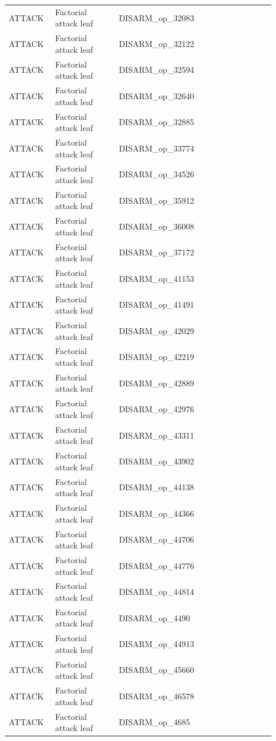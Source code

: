\begin{table}[htbp]
\begin{threeparttable}
\begin{tabular}{p{0.14\linewidth}p{0.22\linewidth}p{0.54\linewidth}}
ATTACK & Factorial attack leaf & DISARM\_op\_32083 \\
ATTACK & Factorial attack leaf & DISARM\_op\_32122 \\
ATTACK & Factorial attack leaf & DISARM\_op\_32594 \\
ATTACK & Factorial attack leaf & DISARM\_op\_32640 \\
ATTACK & Factorial attack leaf & DISARM\_op\_32885 \\
ATTACK & Factorial attack leaf & DISARM\_op\_33774 \\
ATTACK & Factorial attack leaf & DISARM\_op\_34526 \\
ATTACK & Factorial attack leaf & DISARM\_op\_35912 \\
ATTACK & Factorial attack leaf & DISARM\_op\_36008 \\
ATTACK & Factorial attack leaf & DISARM\_op\_37172 \\
ATTACK & Factorial attack leaf & DISARM\_op\_41153 \\
ATTACK & Factorial attack leaf & DISARM\_op\_41491 \\
ATTACK & Factorial attack leaf & DISARM\_op\_42029 \\
ATTACK & Factorial attack leaf & DISARM\_op\_42219 \\
ATTACK & Factorial attack leaf & DISARM\_op\_42889 \\
ATTACK & Factorial attack leaf & DISARM\_op\_42976 \\
ATTACK & Factorial attack leaf & DISARM\_op\_43311 \\
ATTACK & Factorial attack leaf & DISARM\_op\_43902 \\
ATTACK & Factorial attack leaf & DISARM\_op\_44138 \\
ATTACK & Factorial attack leaf & DISARM\_op\_44366 \\
ATTACK & Factorial attack leaf & DISARM\_op\_44706 \\
ATTACK & Factorial attack leaf & DISARM\_op\_44776 \\
ATTACK & Factorial attack leaf & DISARM\_op\_44814 \\
ATTACK & Factorial attack leaf & DISARM\_op\_4490 \\
ATTACK & Factorial attack leaf & DISARM\_op\_44913 \\
ATTACK & Factorial attack leaf & DISARM\_op\_45660 \\
ATTACK & Factorial attack leaf & DISARM\_op\_46578 \\
ATTACK & Factorial attack leaf & DISARM\_op\_4685 \\

\end{tabular}
\end{threeparttable}
\end{table}
